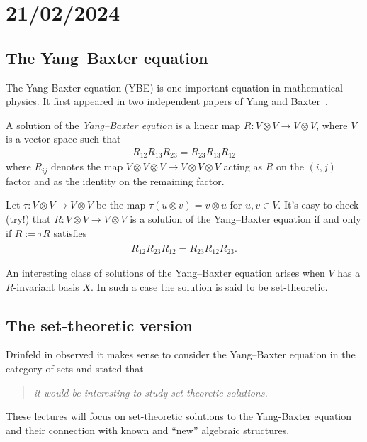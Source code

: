 \section{21/02/2024}

\subsection{The Yang--Baxter equation}
The Yang-Baxter equation (YBE) is one important equation in mathematical physics.
It first appeared in two independent papers of Yang \cite{Yang1967} and Baxter\
\cite{Baxter1971}.

\begin{definition}
    A solution of the \emph{Yang--Baxter eqution} is a linear map  $R: V\otimes V \to V \otimes V$, where $V$ is a vector space such that
    \begin{align*}
        R_{12}R_{13}R_{23} = R_{23}R_{13}R_{12}
    \end{align*}
    where $R_{ij}$ denotes the map $V\otimes V\otimes V \to V \otimes V \otimes V$ acting as $R$ on the $(i,j)$
    factor and as the identity on the remaining factor.
\end{definition}
    Let $\tau: V\otimes V \to V \otimes V$ be the map $\tau(u\otimes v) = v \otimes u$ for $u,v \in V$.
    It's easy to check (try!) that $R: V \otimes V \to V \otimes V$ is a solution of the Yang--Baxter equation if and only if $\bar{R}:=\tau R$ satisfies 
    \begin{align*}
        \bar{R}_{12}\bar{R}_{23}\bar{R}_{12}=\bar{R}_{23}\bar{R}_{12}\bar{R}_{23}.
    \end{align*}

    An interesting class of solutions of the Yang--Baxter equation arises when $V$ has a $R$-invariant basis $X$. In such a case the solution is said to be set-theoretic. 

\subsection{The set-theoretic version}
    Drinfeld in \cite{Dri1992} observed it makes sense to consider the Yang--Baxter equation in the category of sets and stated that 

    
    \begin{quote}\textit{it would be interesting to study set-theoretic solutions.}\end{quote}
    

    These lectures will focus on set-theoretic solutions to the Yang-Baxter equation and their connection with known and ``new'' algebraic structures. 

